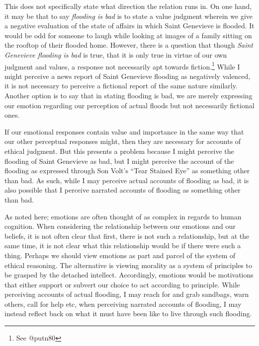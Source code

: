 \documentclass[
  letterpaper,
  DIV=11,
  numbers=noendperiod]{scrartcl}
\theoremstyle{remark}
\begin{document}
This does not specifically state what direction the relation runs in. On
one hand, it may be that to say \emph{flooding is bad} is to state a
value judgment wherein we give a negative evaluation of the state of
affairs in which Saint Genevieve is flooded. It would be odd for someone
to laugh while looking at images of a family sitting on the rooftop of
their flooded home. However, there is a question that though \emph{Saint
Genevieve flooding is bad} is true, that it is only true in virtue of
our own judgment and values, a response not necessarily apt towards
fiction.\footnote{See @putn80} While I might perceive a news report of
Saint Genevieve flooding as negatively valenced, it is not necessary to
perceive a fictional report of the same nature similarly. Another option
is to say that in stating flooding is bad, we are merely expressing our
emotion regarding our perception of actual floods but not necessarily
fictional ones.

If our emotional responses contain value and importance in the same way
that our other perceptual responses might, then they are necessary for
accounts of ethical judgment. But this presents a problem because I
might perceive the flooding of Saint Genevieve as bad, but I might
perceive the account of the flooding as expressed through Son Volt's
``Tear Stained Eye'' as something other than bad. As such, while I may
perceive actual accounts of flooding as bad, it is also possible that I
perceive narrated accounts of flooding as something other than bad.

As noted here; emotions are often thought of as complex in regards to
human cognition. When considering the relationship between our emotions
and our beliefs, it is not often clear that first, there is not such a
relationship, but at the same time, it is not clear what this
relationship would be if there were such a thing. Perhaps we should view
emotions as part and parcel of the system of ethical reasoning. The
alternative is viewing morality as a system of principles to be grasped
by the detached intellect. Accordingly, emotions would be motivations
that either support or subvert our choice to act according to principle.
While perceiving accounts of actual flooding, I may reach for and grab
sandbags, warn others, call for help etc, when perceiving narrated
accounts of flooding, I may instead reflect back on what it must have
been like to live through such flooding.
\end{document}
